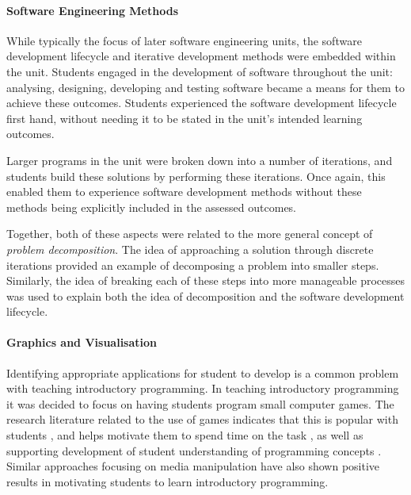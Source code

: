  
\paragraph{Software Engineering Methods} %
\label{par:software_engineering_methods}

While typically the focus of later software engineering units, the software development lifecycle and iterative development methods were embedded within the unit. Students engaged in the development of software throughout the unit: analysing, designing, developing and testing software became a means for them to achieve these outcomes. Students experienced the software development lifecycle first hand, without needing it to be stated in the unit's intended learning outcomes.

Larger programs in the unit were broken down into a number of iterations, and students build these solutions by performing these iterations. Once again, this enabled them to experience software development methods without these methods being explicitly included in the assessed outcomes.

Together, both of these aspects were related to the more general concept of \emph{problem decomposition}. The idea of approaching a solution through discrete iterations provided an example of decomposing a problem into smaller steps. Similarly, the idea of breaking each of these steps into more manageable processes was used to explain both the idea of decomposition and the software development lifecycle. 


\paragraph{Graphics and Visualisation} %
\label{par:graphics_and_visualisation}

Identifying appropriate applications for student to develop is a common problem with teaching introductory programming. In teaching introductory programming it was decided to focus on having students program small computer games. The research literature related to the use of games indicates that this is popular with students \cite{Bayliss:2006}, and helps motivate them to spend time on the task \cite{Feldgen:2004,Rajaravivarma:2005,Cliburn:2006}, as well as supporting development of student understanding of programming concepts \cite{Roberts:1995,Leutenegger:2007}. Similar approaches focusing on media manipulation \cite{Guzdial:2002,Guzdial:2003} have also shown positive results in motivating students to learn introductory programming.

